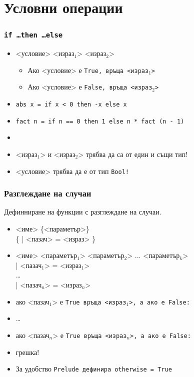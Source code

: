 \documentclass{beamer}
\begin{document}
\section{Условни операции}

\begin{frame}
  \frametitle{\tt{if} \ldots \tt{then} \ldots \tt{else}}
  \begin{itemize}[<+->]
  \item {} <условие>  <израз$_1$>  <израз$_2$>
    \begin{itemize}[<.->]
    \item Ако <условие> е \tt{True}, връща <израз$_1$>
    \item Ако <условие> е \tt{False}, връща <израз$_2$>
    \end{itemize}
  \item \tt{abs x = if x < 0 then -x else x}
  \item \tt{fact n = if n == 0 then 1 else n * fact (n - 1)}
  \item {}
  \item \alert{<израз$_1$> и <израз$_2$> трябва да са от един и същи тип!}
  \item \alert{<условие> трябва да е от тип \tt{Bool}!}
  \end{itemize}
\end{frame}

\begin{frame}[fragile]
  \frametitle{Разглеждане на случаи}
  Дефинниране на функции с разглеждане на случаи.
  \begin{itemize}
    \item{} <име> \{<параметър>\}\\
      \hspace{3ex} \{ \tta| <пазач> \tta= <израз> \}
      \pause
    \item{} <име> <параметър$_1$> <параметър$_2$> ... <параметър$_k$>\\
      \hspace{3ex} \tta| <пазач$_1$> \tta= <израз$_1$>\\
      \ldots\\
      \hspace{3ex} \tta| <пазач$_n$> \tta= <израз$_n$>\\
      \pause
  \item ако <пазач$_1$> е \tt{True} връща <израз$_1$>, а ако е \tt{False}:
  \item \ldots
  \item ако <пазач$_n$> е \tt{True} връща <израз$_n$>, а ако е \tt{False}:
  \item \alert{грешка!}
    \pause
  \item За удобство \tt{Prelude} дефинира \tt{otherwise = True}
  \end{itemize}
\end{frame}
\end{document}
